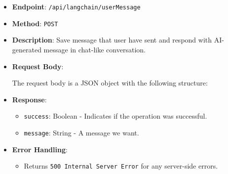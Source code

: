 \begin{itemize}
\item
  \textbf{Endpoint}: \texttt{/api/langchain/userMessage}
\item
  \textbf{Method}: \texttt{POST}
\item
  \textbf{Description}: Save message that user have sent and respond
  with AI-generated message in chat-like conversation.
\item
  \textbf{Request Body}:

  The request body is a JSON object with the following structure:

\begin{Shaded}
\begin{Highlighting}[]
\FunctionTok{\{}
  \FunctionTok{:} \FunctionTok{,}
  \FunctionTok{:} \FunctionTok{,}
  \FunctionTok{:} \FunctionTok{\{}
      \FunctionTok{:} \FunctionTok{,}
      \FunctionTok{:} \FunctionTok{,}
      \FunctionTok{:} \FunctionTok{,}
      \FunctionTok{:} \FunctionTok{,}
      \FunctionTok{:} 

  \FunctionTok{\},}
  \FunctionTok{:} \FunctionTok{\{}
      \FunctionTok{:} \FunctionTok{,}
      \FunctionTok{:} \FunctionTok{,}
      \FunctionTok{:} 

  \FunctionTok{\},}
  \FunctionTok{:} 
\FunctionTok{\}}
\end{Highlighting}
\end{Shaded}
\item
  \textbf{Response}:

  \begin{itemize}
  \tightlist
  \item
    \texttt{success}: Boolean - Indicates if the operation was
    successful.
  \item
    \texttt{message}: String - A message we want.
  \end{itemize}
\item
  \textbf{Error Handling}:

  \begin{itemize}
  \tightlist
  \item
    Returns \texttt{500\ Internal\ Server\ Error} for any server-side
    errors.
  \end{itemize}
\end{itemize}

